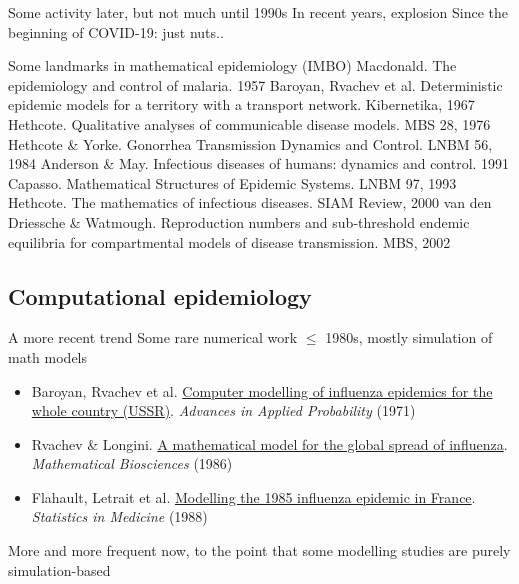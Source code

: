 \documentclass[aspectratio=169]{beamer}\usepackage[]{graphicx}\usepackage[]{xcolor}
\begin{document}
    
\begin{frame}{Some activity later, but not much until 1990s}
\bbullet In recent years, explosion
\vfill
\bbullet Since the beginning of COVID-19: just nuts..
\end{frame}

\begin{frame}{Some landmarks in mathematical epidemiology (IMBO)}
\bbullet Macdonald. The epidemiology and control of malaria. 1957
\vfill
\bbullet Baroyan, Rvachev et al. Deterministic epidemic models for a territory with a transport network. Kibernetika, 1967 \nocite{BaroyanRvachev1967}
\vfill Hethcote. Qualitative analyses of communicable disease models. MBS 28, 1976 \nocite{Hethcote1976}
\vfill
\bbullet Hethcote \& Yorke. Gonorrhea Transmission Dynamics and Control. LNBM 56, 1984 \nocite{HethcoteYorke1984}
\vfill
\bbullet Anderson \& May. Infectious diseases of humans: dynamics and control. 1991 \nocite{AndersonMay1991}
\vfill
\bbullet Capasso. Mathematical Structures of Epidemic Systems. LNBM 97, 1993
\vfill
\bbullet Hethcote. The mathematics of infectious diseases. SIAM Review, 2000 \nocite{Hethcote2000}
\vfill
\bbullet van den Driessche \& Watmough. Reproduction numbers and sub-threshold endemic equilibria for compartmental models of disease transmission. MBS, 2002 \nocite{VdDWatmough2002}  
\end{frame}


\subsection{Computational epidemiology}


\begin{frame}{A more recent trend}
\bbullet Some rare numerical work $\leq$ 1980s, mostly simulation of math models
\begin{itemize}
    \item Baroyan, Rvachev et al. \href{https://doi.org/10.2307/1426167}{Computer modelling of influenza epidemics for the whole country (USSR)}. \emph{Advances in Applied Probability} (1971) \nocite{BaroyanRvachevBasilevskyEzmakovEtAl1971}
    \item Rvachev \& Longini. \href{https://doi.org/10.1016/0025-5564(85)90064-1}{A mathematical model for the global spread of influenza}. \emph{Mathematical Biosciences} (1986) 
    \item Flahault, Letrait et al. \href{https://doi.org/10.1002/sim.4780071107}{Modelling the 1985 influenza epidemic in France}. \emph{Statistics in Medicine} (1988)
\end{itemize}
\vfill
\bbullet More and more frequent now, to the point that some modelling studies are purely simulation-based
\end{frame}
\end{document}
